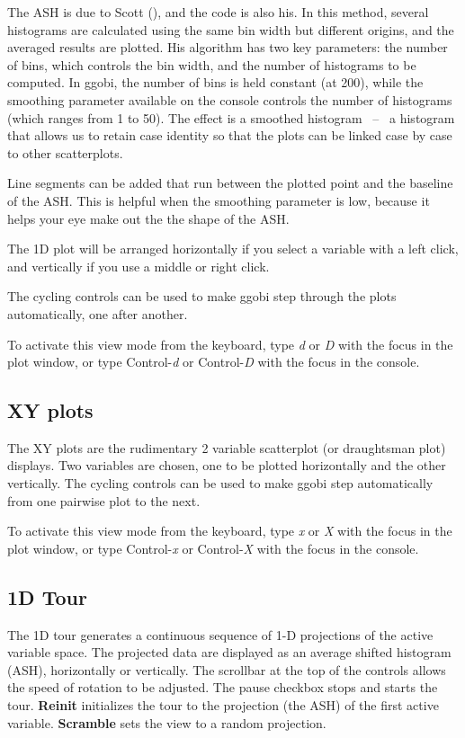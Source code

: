\documentclass[11pt]{article}
\def\Widget#1{\textbf{#1}}
\begin{document}
The ASH is due to Scott (\cite{Scott92}), and the code is also his.
In this method, several histograms are calculated using the same bin
width but different origins, and the averaged results are plotted.
His algorithm has two key parameters: the number of bins, which controls
the bin width, and the number of histograms to be computed.  In ggobi,
the number of bins is held constant (at 200), while the smoothing
parameter available on the console controls the number of histograms
(which ranges from 1 to 50).  The effect is a smoothed histogram ~--~
a histogram that allows us to retain case identity so that the plots
can be linked case by case to other scatterplots.

Line segments can be added that run between the plotted point and the
baseline of the ASH.  This is helpful when the smoothing parameter is low,
because it helps your eye make out the the shape of the ASH.

The 1D plot will be arranged horizontally if you select a variable
with a left click, and vertically if you use a middle or right click.

The cycling controls can be used to make ggobi step through the
plots automatically, one after another.

To activate this view mode from the keyboard, type {\em d} or {\em D}
with the focus in the plot window, or type Control-{\em d} or
Control-{\em D} with the focus in the console.

\subsection{XY plots}

The XY plots are the rudimentary 2 variable scatterplot (or draughtsman
plot) displays. Two variables are chosen, one to be plotted horizontally
and the other vertically. The cycling controls can be used to make ggobi
step automatically from one pairwise plot to the next.

To activate this view mode from the keyboard, type {\em x} or {\em X}
with the focus in the plot window, or type Control-{\em x} or
Control-{\em X} with the focus in the console.

\subsection{1D Tour}
\label{slbl:1DTour}

The 1D tour generates a continuous sequence of 1-D projections of the
active variable space. The projected data are displayed as an average
shifted histogram (ASH), horizontally or vertically. The scrollbar at
the top of the controls allows the speed of rotation to be
adjusted. The pause checkbox stops and starts the
tour. \Widget{Reinit} initializes the tour to the projection (the ASH)
of the first active variable.  \Widget{Scramble} sets the view to a
random projection.
\end{document}
